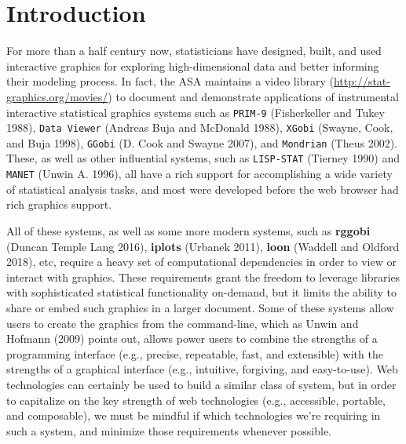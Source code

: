 \documentclass[12pt,]{article}
\theoremstyle{definition}
\theoremstyle{definition}
\theoremstyle{definition}
\theoremstyle{remark}
\begin{document}
\newpage
{} %


\hypertarget{intro}{%
\section{Introduction}\label{intro}}

For more than a half century now, statisticians have designed, built,
and used interactive graphics for exploring high-dimensional data and
better informing their modeling process. In fact, the ASA maintains a
video library (\url{http://stat-graphics.org/movies/}) to document and
demonstrate applications of instrumental interactive statistical
graphics systems such as \texttt{PRIM-9} (Fisherkeller and Tukey 1988),
\texttt{Data\ Viewer} (Andreas Buja and McDonald 1988), \texttt{XGobi}
(Swayne, Cook, and Buja 1998), \texttt{GGobi} (D. Cook and Swayne 2007),
and \texttt{Mondrian} (Theus 2002). These, as well as other influential
systems, such as \texttt{LISP-STAT} (Tierney 1990) and \texttt{MANET}
(Unwin A. 1996), all have a rich support for accomplishing a wide
variety of statistical analysis tasks, and most were developed before
the web browser had rich graphics support.

All of these systems, as well as some more modern systems, such as
\textbf{rggobi} (Duncan Temple Lang 2016), \textbf{iplots} (Urbanek
2011), \textbf{loon} (Waddell and Oldford 2018), etc, require a heavy
set of computational dependencies in order to view or interact with
graphics. These requirements grant the freedom to leverage libraries
with sophisticated statistical functionality on-demand, but it limits
the ability to share or embed such graphics in a larger document. Some
of these systems allow users to create the graphics from the
command-line, which as Unwin and Hofmann (2009) points out, allows power
users to combine the strengths of a programming interface (e.g.,
precise, repeatable, fast, and extensible) with the strengths of a
graphical interface (e.g., intuitive, forgiving, and easy-to-use). Web
technologies can certainly be used to build a similar class of system,
but in order to capitalize on the key strength of web technologies
(e.g., accessible, portable, and composable), we must be mindful if
which technologies we're requiring in such a system, and minimize those
requirements whenever possible.
\end{document}
